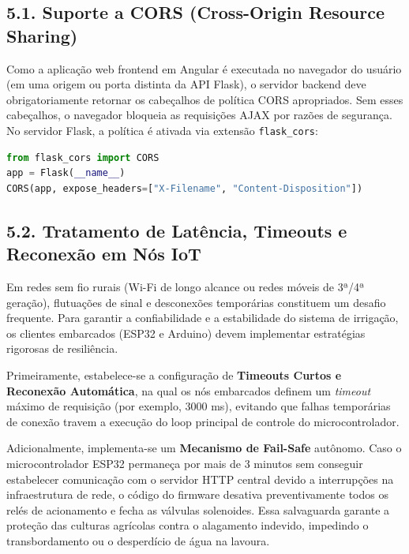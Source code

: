 \subsection*{5.1. Suporte a CORS (Cross-Origin Resource Sharing)}

Como a aplicação web frontend em Angular é executada no navegador do usuário (em uma origem ou porta distinta da API Flask), o servidor backend deve obrigatoriamente retornar os cabeçalhos de política CORS apropriados. Sem esses cabeçalhos, o navegador bloqueia as requisições AJAX por razões de segurança. No servidor Flask, a política é ativada via extensão \texttt{flask\_cors}:

\begin{lstlisting}[language=Python]
from flask_cors import CORS
app = Flask(__name__)
CORS(app, expose_headers=["X-Filename", "Content-Disposition"])
\end{lstlisting}

\subsection*{5.2. Tratamento de Latência, Timeouts e Reconexão em Nós IoT}

Em redes sem fio rurais (Wi-Fi de longo alcance ou redes móveis de 3ª/4ª geração), flutuações de sinal e desconexões temporárias constituem um desafio frequente. Para garantir a confiabilidade e a estabilidade do sistema de irrigação, os clientes embarcados (ESP32 e Arduino) devem implementar estratégias rigorosas de resiliência.

Primeiramente, estabelece-se a configuração de \textbf{Timeouts Curtos e Reconexão Automática}, na qual os nós embarcados definem um \textit{timeout} máximo de requisição (por exemplo, 3000 ms), evitando que falhas temporárias de conexão travem a execução do loop principal de controle do microcontrolador. 

Adicionalmente, implementa-se um \textbf{Mecanismo de Fail-Safe} autônomo. Caso o microcontrolador ESP32 permaneça por mais de 3 minutos sem conseguir estabelecer comunicação com o servidor HTTP central devido a interrupções na infraestrutura de rede, o código do firmware desativa preventivamente todos os relés de acionamento e fecha as válvulas solenoides. Essa salvaguarda garante a proteção das culturas agrícolas contra o alagamento indevido, impedindo o transbordamento ou o desperdício de água na lavoura.

\vspace{1.5em}

